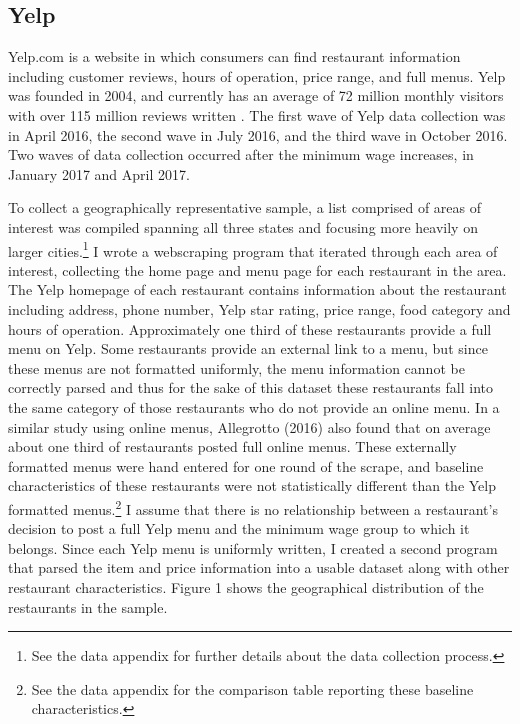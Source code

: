 \documentclass[11pt]{article}
\begin{document}
\subsection{Yelp}

Yelp.com is a website in which consumers can find restaurant information including customer reviews, hours of operation, price range, and full menus. Yelp was founded in 2004, and currently has an average of 72 million monthly visitors with over 115 million reviews written \cite{yelpstat}. The first wave of Yelp data collection was in April 2016, the second wave in July 2016, and the third wave in October 2016. Two waves of data collection occurred after the minimum wage increases, in January 2017 and April 2017.

To collect a geographically representative sample, a list comprised of areas of interest was compiled spanning all three states and focusing more heavily on larger cities.\footnote{See the data appendix for further details about the data collection process.} I wrote a webscraping program that iterated through each area of interest, collecting the home page and menu page for each restaurant in the area. The Yelp homepage of each restaurant contains information about the restaurant including address, phone number, Yelp star rating, price range, food category and hours of operation. Approximately one third of these restaurants provide a full menu on Yelp. Some restaurants provide an external link to a menu, but since these menus are not formatted uniformly, the menu information cannot be correctly parsed and thus for the sake of this dataset these restaurants fall into the same category of those restaurants who do not provide an online menu. In a similar study using online menus, Allegrotto (2016) also found that on average about one third of restaurants posted full online menus\nocite{allegretto2016local}. These externally formatted menus were hand entered for one round of the scrape, and baseline characteristics of these restaurants were not statistically different than the Yelp formatted menus.\footnote{See the data appendix for the comparison table reporting these baseline characteristics.} I assume that there is no relationship between a restaurant's decision to post a full Yelp menu and the minimum wage group to which it belongs. Since each Yelp menu is uniformly written, I created a second program that parsed the item and price information into a usable dataset along with other restaurant characteristics. Figure 1 shows the geographical distribution of the restaurants in the sample.
\end{document}

